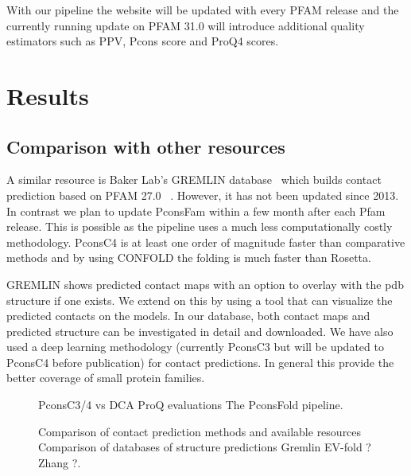 \documentclass[a4,center,fleqn]{NAR}
\begin{document}
With our pipeline the website will be updated with every PFAM release
and the currently running update on PFAM 31.0 will introduce
additional quality estimators such as PPV, Pcons score and ProQ4
scores. 

\section{Results}

\subsection{Comparison with other resources}

A similar resource is Baker Lab’s GREMLIN database~\cite{Kamisetty2013} which builds contact prediction based on
PFAM 27.0~\cite{Sonnhammer:1997} . However, it has not been updated since
2013. In contrast we plan to update PconsFam within a few month after
each Pfam release. This is possible as the pipeline uses a much less
computationally costly methodology. PconsC4 is at least one order of
magnitude faster than comparative methods and by using CONFOLD the
folding is much faster than Rosetta.


GREMLIN shows predicted contact maps with an option to overlay with
the pdb structure if one exists. We extend on this by using a tool
that can visualize the predicted contacts on the models. In our
database, both contact maps and predicted structure can be
investigated in detail and downloaded.  We have also used a deep
learning methodology (currently PconsC3 but will be updated to PconsC4
before publication) for contact predictions. In general this provide
the better coverage of small protein families.




\begin{figure}[t]
\begin{center}
\end{center}
\caption{PconsC3/4 vs DCA
ProQ evaluations 
The PconsFold pipeline.}
\label{fig:Pipeline}
\end{figure}


\begin{figure}[t]
\begin{center}
\end{center}
\caption{Comparison of contact prediction methods and available resources
Comparison of databases of structure predictions
Gremlin
EV-fold ?
Zhang ?.}
\label{fig:comparison}
\end{figure}
\end{document}
